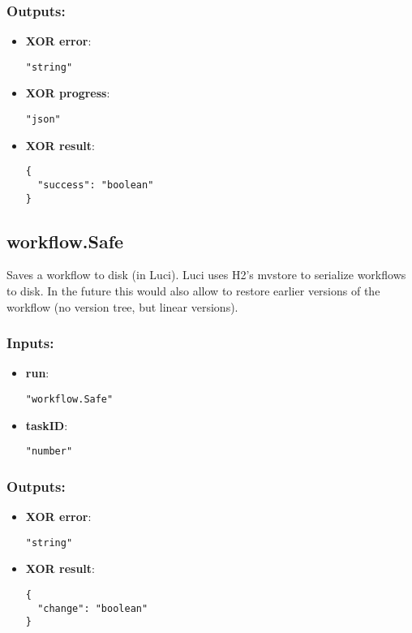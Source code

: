 \subsubsection*{Outputs:}
\begin{itemize}
    \item \textbf{XOR error}: 
\begin{lstlisting}
"string"
\end{lstlisting}
    \item \textbf{XOR progress}: 
\begin{lstlisting}
"json"
\end{lstlisting}
    \item \textbf{XOR result}: 
\begin{lstlisting}
{
  "success": "boolean"
}
\end{lstlisting}
  \end{itemize}

\subsection{workflow.Safe}
Saves
 a workflow to disk (in Luci). Luci uses H2's mvstore to serialize 
workflows to disk. In the future this would also allow to restore 
earlier versions of the workflow (no version tree, but linear versions).
\subsubsection*{Inputs:}
\begin{itemize}
    \item \textbf{run}: 
\begin{lstlisting}
"workflow.Safe"
\end{lstlisting}
    \item \textbf{taskID}: 
\begin{lstlisting}
"number"
\end{lstlisting}
  \end{itemize}

\subsubsection*{Outputs:}
\begin{itemize}
    \item \textbf{XOR error}: 
\begin{lstlisting}
"string"
\end{lstlisting}
    \item \textbf{XOR result}: 
\begin{lstlisting}
{
  "change": "boolean"
}
\end{lstlisting}
  \end{itemize}

